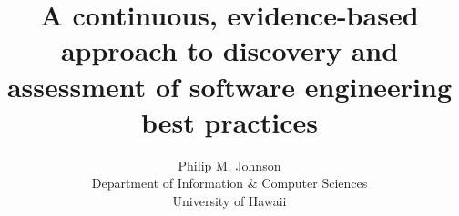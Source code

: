 \documentclass[11pt]{article}
\begin{document}
\title{
A continuous, evidence-based approach to discovery and assessment of 
software engineering best practices
}

\medskip

\author{
Philip M. Johnson\\ 
Department of Information \& Computer Sciences\\
University of Hawaii\\
\protect \medskip
}

\maketitle

\pagestyle{plain}

\tableofcontents



\newpage



%
%
\end{document}
